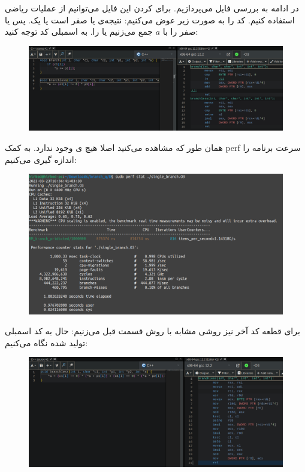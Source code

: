 \begin{enumerate}
    در ادامه به بررسی فایل
    می‌پردازیم. برای 
    کردن این فایل می‌توانیم از عملیات ریاضی استفاده کنیم. کد را به صورت زیر عوض می‌کنیم:
    نتیجه‌ی
    یا صفر است یا یک. پس یا صفر را با $a$
    جمع می‌زنیم یا
    را. به اسمبلی کد توجه کنید:
    \begin{figure}[H]
        \centerline{\includegraphics[scale=0.3]{pics/5/D/godbolt_single_branch.png}}
    \end{figure}
    همان طور که مشاهده می‌کنید اصلا هیچ
    ی
    وجود ندارد. به کمک perf سرعت برنامه را اندازه گیری می‌کنیم:
    \begin{figure}[H]
        \centerline{\includegraphics[scale=0.35]{pics/5/D/single_branch_better.png}}
    \end{figure}
    برای قطعه کد آخر نیز روشی مشابه با روش قسمت قبل می‌زنیم:
    حال به کد اسمبلی تولید شده نگاه می‌کنیم:
    \begin{figure}[H]
        \centerline{\includegraphics[scale=0.3]{pics/5/D/godbolt_pure_random.png}}

\end{figure}
\end{enumerate}
